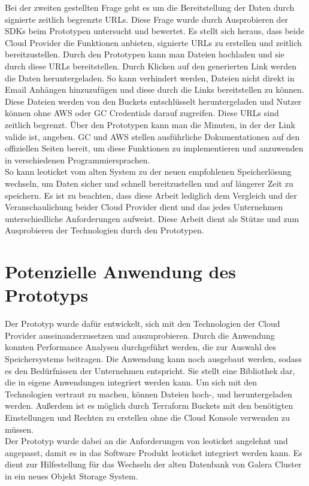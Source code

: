 Bei der zweiten gestellten Frage geht es um die Bereitstellung der Daten durch signierte zeitlich begrenzte URLs. Diese Frage wurde durch Ausprobieren der SDKs beim Prototypen untersucht und bewertet. Es stellt sich heraus, dass beide Cloud Provider die Funktionen anbieten, signierte URLs zu erstellen und zeitlich bereitzustellen. Durch den Prototypen kann man Dateien hochladen und sie durch diese URLs bereitstellen. Durch Klicken auf den generierten Link werden die Daten heruntergeladen. So kann verhindert werden, Dateien nicht direkt in Email Anhängen hinzuzufügen und diese durch die Links bereitstellen zu können. Diese Dateien werden von den Buckets entschlüsselt heruntergeladen und Nutzer können ohne AWS oder GC Credentials darauf zugreifen. Diese URLs sind zeitlich begrenzt. Über den Prototypen kann man die Minuten, in der der Link valide ist, angeben. GC und AWS stellen ausführliche Dokumentationen auf den offiziellen Seiten bereit, um diese Funktionen zu implementieren und anzuwenden in verschiedenen Programmiersprachen.\\

So kann leoticket vom alten System zu der neuen empfohlenen Speicherlösung wechseln, um Daten sicher und schnell bereitzustellen und auf längerer Zeit zu speichern. Es ist zu beachten, dass diese Arbeit lediglich dem Vergleich und der Veranschaulichung beider Cloud Provider dient und das jedes Unternehmen unterschiedliche Anforderungen aufweist. Diese Arbeit dient als Stütze und zum Ausprobieren der Technologien durch den Prototypen. 

\section{Potenzielle Anwendung des Prototyps}

Der Prototyp wurde dafür entwickelt, sich mit den Technologien der Cloud Provider auseinanderzusetzen und auszuprobieren. Durch die Anwendung konnten Performance Analysen durchgeführt werden, die zur Auswahl des Speichersystems beitragen. Die Anwendung kann noch ausgebaut werden, sodass es den Bedürfnissen der Unternehmen entspricht. Sie stellt eine Bibliothek dar, die in eigene Anwendungen integriert werden kann. Um sich mit den Technologien vertraut zu machen, können Dateien hoch-, und heruntergeladen werden. Außerdem ist es möglich durch Terraform Buckets mit den benötigten Einstellungen und Rechten zu erstellen ohne die Cloud Konsole verwenden zu müssen.\\

Der Prototyp wurde dabei an die Anforderungen von leoticket angelehnt und angepasst, damit es in das Software Produkt leoticket integriert werden kann. Es dient zur Hilfestellung für das Wechseln der alten Datenbank von Galera Cluster in ein neues Objekt Storage System. 
